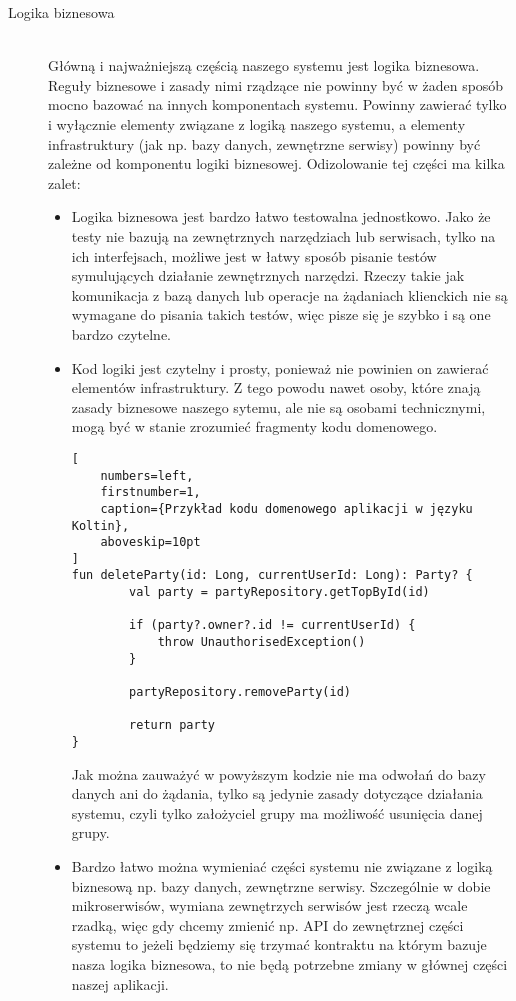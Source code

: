 \begin{description}
  \item[Logika biznesowa] \hfill \\ Główną i najważniejszą częścią naszego systemu jest logika biznesowa. Reguły biznesowe i zasady nimi rządzące nie powinny być w żaden sposób mocno bazować na innych komponentach systemu. Powinny zawierać tylko i wyłącznie elementy związane z logiką naszego systemu, a elementy infrastruktury (jak np. bazy danych, zewnętrzne serwisy) powinny być zależne od komponentu logiki biznesowej. Odizolowanie tej części ma kilka zalet:
\begin{itemize}
  \item Logika biznesowa jest bardzo łatwo testowalna jednostkowo. Jako że testy nie bazują na zewnętrznych narzędziach lub serwisach, tylko na ich interfejsach, możliwe jest w łatwy sposób pisanie testów symulujących działanie zewnętrznych narzędzi. Rzeczy takie jak komunikacja z bazą danych lub operacje na żądaniach klienckich nie są wymagane do pisania takich testów, więc pisze się je szybko i są one bardzo czytelne.
  \item Kod logiki jest czytelny i prosty, ponieważ nie powinien on zawierać elementów infrastruktury. Z tego powodu nawet osoby, które znają zasady biznesowe naszego sytemu, ale nie są osobami technicznymi, mogą być w stanie zrozumieć fragmenty kodu domenowego.
\begin{addmargin}[6mm]{0mm}
\begin{lstlisting}[
    numbers=left,
    firstnumber=1,
    caption={Przykład kodu domenowego aplikacji w języku Koltin},
    aboveskip=10pt
]
fun deleteParty(id: Long, currentUserId: Long): Party? {
        val party = partyRepository.getTopById(id)

        if (party?.owner?.id != currentUserId) {
            throw UnauthorisedException()
        }

        partyRepository.removeParty(id)

        return party
}
\end{lstlisting}
\end{addmargin}
  Jak można zauważyć w powyższym kodzie nie ma odwołań do bazy danych ani do żądania, tylko są jedynie zasady dotyczące działania systemu, czyli tylko założyciel grupy ma możliwość usunięcia danej grupy.
  \item Bardzo łatwo można wymieniać części systemu nie związane z logiką biznesową np. bazy danych, zewnętrzne serwisy. Szczególnie w dobie mikroserwisów, wymiana zewnętrzych serwisów jest rzeczą wcale rzadką, więc gdy chcemy zmienić np. API do zewnętrznej części systemu to jeżeli będziemy się trzymać kontraktu na którym bazuje nasza logika biznesowa, to nie będą potrzebne zmiany w głównej części naszej aplikacji.
\end{itemize}



\end{description}
